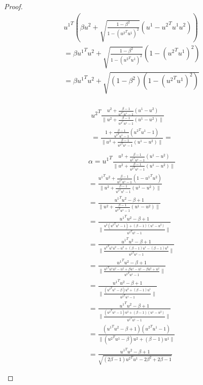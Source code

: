 \begin{proof}
\begin{align*}
{u^1}^T(\beta u^2 + \sqrt{\frac{1 - \beta^2}{1 - ({u^2}^Tu^1)^2}} (u^1 - {u^2}^Tu^1 u^2 )) \\
=\beta {u^1}^Tu^2 + \sqrt{\frac{1 - \beta^2}{1 - ({u^2}^Tu^1)^2}} (1 - ({u^2}^Tu^1)^2 ) \\
=\beta {u^1}^Tu^2 + \sqrt{(1 - \beta^2)\left(1 - ({u^2}^Tu^1)^2\right)}  \\
\end{align*}

\begin{align*}
{u^2}^T\frac{u^2 + \frac{\beta - 1}{{u^2}^Tu^1 - 1} (u^1 - u^2)}{\|u^2 + \frac{\beta - 1}{{u^2}^Tu^1 - 1} (u^1 - u^2)\|} \\
= \frac{1 + \frac{\beta - 1}{{u^2}^Tu^1 - 1} ({u^2}^Tu^1 - 1)}{\|u^2 + \frac{\beta - 1}{{u^2}^Tu^1 - 1} (u^1 - u^2)\|} = \\
\end{align*}
\begin{align*}
\alpha = {u^1}^T\frac{u^2 + \frac{\beta - 1}{{u^2}^Tu^1 - 1} (u^1 - u^2)}{\|u^2 + \frac{\beta - 1}{{u^2}^Tu^1 - 1} (u^1 - u^2)\|} \\
=\frac{{u^1}^Tu^2 + \frac{\beta - 1}{{u^2}^Tu^1 - 1} (1 - {u^1}^Tu^2)}{\|u^2 + \frac{\beta - 1}{{u^2}^Tu^1 - 1} (u^1 - u^2)\|}\\
=\frac{{u^1}^Tu^2 - \beta + 1}{\|u^2 + \frac{\beta - 1}{{u^2}^Tu^1 - 1} (u^1 - u^2)\|}\\
=\frac{{u^1}^Tu^2 - \beta + 1}{\|\frac{u^2({u^2}^Tu^1 - 1) + (\beta - 1) (u^1 - u^2)}{{u^2}^Tu^1 - 1}\|}\\
=\frac{{u^1}^Tu^2 - \beta + 1}{\|\frac{{u^2}^Tu^1u^2 - u^2 + (\beta - 1)u^1 - (\beta - 1)u^2}{{u^2}^Tu^1 - 1}\|}\\
=\frac{{u^1}^Tu^2 - \beta + 1}{\|\frac{{u^2}^Tu^1u^2 - u^2 + \beta u^1 - u^1 - \beta u^2 + u^2}{{u^2}^Tu^1 - 1}\|}\\
=\frac{{u^1}^Tu^2 - \beta + 1}{\|\frac{({u^2}^Tu^1 - \beta)u^2 + (\beta - 1)u^1}{{u^2}^Tu^1 - 1}\|}\\
=\frac{{u^1}^Tu^2 - \beta + 1}{\|\frac{({u^2}^Tu^1 - 1)u^2 + (\beta-1) (u^1 - u^2)}{{u^2}^Tu^1 - 1}\|}\\
=\frac{({u^1}^Tu^2 - \beta + 1)({u^2}^Tu^1 - 1)}{\|({u^2}^Tu^1 - \beta)u^2 + (\beta - 1)u^1\|}\\
=\frac{{u^1}^Tu^2 - \beta + 1}{\sqrt{(2\beta - 1){u^2}^Tu^1 -2\beta^2 + 2 \beta  - 1 }}\\
\end{align*}
\begin{align*}

\end{align*}
\end{proof}
